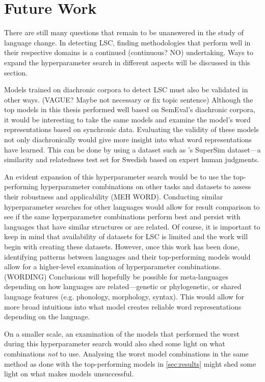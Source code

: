 \section{Future Work}
\label{sec:futurework}

There are still many questions that remain to be unanswered in the study of language change. In detecting LSC, finding methodologies that perform well in their respective domains is a continued (continuous? NO) undertaking. Ways to expand the hyperparameter search in different aspects will be discussed in this section.

Models trained on diachronic corpora to detect LSC must also be validated in other ways. (VAGUE? Maybe not necessary or fix topic sentence) Although the top models in this thesis performed well based on SemEval’s diachronic corpora, it would be interesting to take the same models and examine the model’s word representations based on synchronic data. Evaluating the validity of these models not only diachronically would give more insight into what word representations have learned. This can be done by using a dataset such as \citet{supersim2021}'s SuperSim dataset—a similarity and relatedness test set for Swedish based on expert human judgments. 

An evident expansion of this hyperparameter search would be to use the top-performing hyperparameter combinations on other tasks and datasets to assess their robustness and applicability (MEH WORD). Conducting similar hyperparameter searches for other languages would allow for result comparison to see if the same hyperparameter combinations perform best and persist with languages that have similar structures or are related. Of course, it is important to keep in mind that availability of datasets for LSC is limited and the work will begin with creating these datasets. However, once this work has been done, identifying patterns between languages and their top-performing models would allow for a higher-level examination of hyperparameter combinations. (WORDING) Conclusions will hopefully be possible for meta-languages depending on how languages are related—genetic or phylogenetic, or shared language features (e.g. phonology, morphology, syntax). This would allow for more broad intuitions into what model creates reliable word representations depending on the language.

On a smaller scale, an examination of the models that performed the worst during this hyperparameter search would also shed some light on what combinations \emph{not} to use. Analysing the worst model combinations in the same method as done with the top-performing models in \autoref{sec:results} might shed some light on what makes models unsuccessful. 



